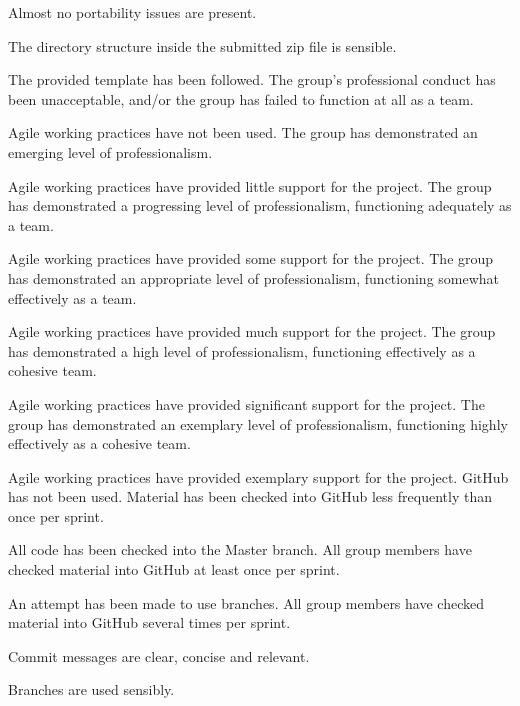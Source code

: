 \documentclass{../fal_assignment}
\begin{document}
\begin{markingrubric}
        \grade Almost no portability issues are present.
            \par The directory structure inside the submitted zip file is sensible.
            \par The provided template has been followed.
        \grade\fail The group's professional conduct has been unacceptable,
            and/or the group has failed to function at all as a team.
            \par Agile working practices have not been used.
        \grade The group has demonstrated an emerging level of professionalism.
            \par Agile working practices have provided little support for the project.
        \grade The group has demonstrated a progressing level of professionalism,
            functioning adequately as a team.
            \par Agile working practices have provided some support for the project.
        \grade The group has demonstrated an appropriate level of professionalism,
            functioning somewhat effectively as a team.
            \par Agile working practices have provided much support for the project.
        \grade The group has demonstrated a high level of professionalism,
            functioning effectively as a cohesive team.
            \par Agile working practices have provided significant support for the project.
        \grade The group has demonstrated an exemplary level of professionalism,
            functioning highly effectively as a cohesive team.
            \par Agile working practices have provided exemplary support for the project.
        \grade\fail GitHub has not been used.
        \grade Material has been checked into GitHub less frequently than once per sprint.
            \par All code has been checked into the Master branch.
        \grade All group members have checked material into GitHub at least once per sprint.
            \par An attempt has been made to use branches.
        \grade All group members have checked material into GitHub several times per sprint.
            \par Commit messages are clear, concise and relevant.
            \par Branches are used sensibly.

\end{markingrubric}
\end{document}
